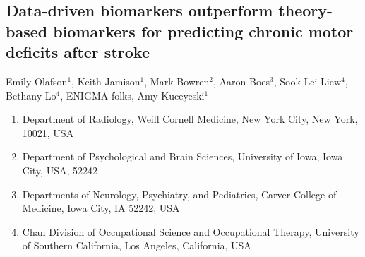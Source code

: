 \documentclass[10pt]{article}
\begin{document}
 

\begin{center}
{\large \section*{Data-driven biomarkers outperform theory-based biomarkers for predicting chronic motor deficits after stroke}}
\end{center}

\begin{center}
Emily Olafson$^1$, Keith Jamison$^1$, Mark Bowren$^2$, Aaron Boes$^3$, Sook-Lei Liew$^4$, Bethany Lo$^4$, ENIGMA folks, Amy Kuceyeski$^1$
\end{center}

\begin{enumerate}
\item \textmd{Department of Radiology, Weill Cornell Medicine, New York City, New York, 10021, USA} 
\item \textmd{Department of Psychological and Brain Sciences, University of Iowa, Iowa City, USA, 52242} 
\item \textmd{Departments of Neurology, Psychiatry, and Pediatrics, Carver College of Medicine, Iowa City, IA 52242, USA} 
\item \textmd{Chan Division of Occupational Science and Occupational Therapy, University of Southern California, Los Angeles, California, USA}
\end{enumerate}
\end{document}
